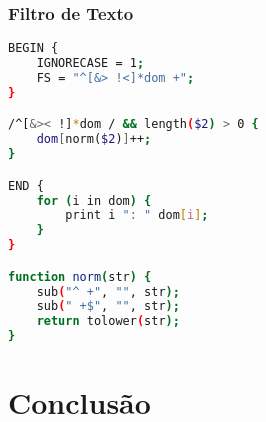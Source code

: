 \documentclass{article}
\begin{document}
\subsubsection{Filtro de Texto}

\begin{lstlisting}[language=bash]
BEGIN {
	IGNORECASE = 1;
	FS = "^[&> !<]*dom +";
}

/^[&>< !]*dom / && length($2) > 0 {
	dom[norm($2)]++;
}

END {
	for (i in dom) {
		print i ": " dom[i];
	}
}

function norm(str) {
	sub("^ +", "", str);
	sub(" +$", "", str);
	return tolower(str);
}

\end{lstlisting}



\section{Conclusão}
\end{document}
